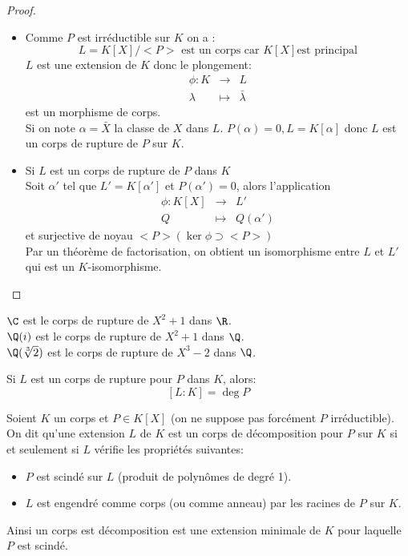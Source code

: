 \begin{proof}

	\begin{itemize}
		\item Comme $P$ est irréductible sur $K$ on a :
		      $$ L = K[X]/<P> \text{ est un corps car } K[X] \text{est principal}$$
		      $L$ est une extension de $K$ donc le plongement:
		      \begin{eqnarray*}
			      \phi: K &\to& L\\
			      \lambda   &\mapsto &\bar{\lambda}
		      \end{eqnarray*}
		      est un morphisme de corps.\\
		      Si on note $\alpha = \bar{X}$ la classe de $X$ dans $L$. $P(\alpha) = 0, L = K[\alpha]$
		      donc $L$ est un corps de rupture de $P$ sur $K$.
		\item Si $L$ est un corps de rupture de $P$ dans $K$ \\
		      Soit $\alpha'$ tel que $L' = K[\alpha']$ et $P(\alpha') = 0$, alors l'application
		      \begin{eqnarray*}
			      \phi : K[X] &\to& L'\\
			      Q &   \mapsto & Q(\alpha')
		      \end{eqnarray*}
		      et surjective de noyau $<P> (\ker \phi \supset <P>)$\\
		      Par un théorème de factorisation, on obtient un isomorphisme entre $L$ et $L'$ qui est un $K$-isomorphisme.
	\end{itemize}
\end{proof}

\begin{example}
	$\C$ est le corps de rupture de $X^2+1$ dans $\R$.\\
	$\Q(i)$ est le corps de rupture de $X^2+1$ dans $\Q$.\\
	$\Q(\sqrt[3]{2})$ est le corps de rupture de $X^3-2$ dans $\Q$.\\
\end{example}

\begin{remarque}[Important]
	Si $L$ est un corps de rupture pour $P$ dans $K$, alors:
	$$ [L : K] = \deg P$$
\end{remarque}


\begin{definition}
	Soient $K$ un corps et $P\in K[X]$ (on ne suppose pas forcément $P$ irréductible).\\
	On dit qu'une extension $L$ de $K$ est un corps de décomposition pour $P$ sur $K$ si et seulement si $L$ vérifie les propriétés suivantes:
	\begin{itemize}
		\item $P$ est scindé sur $L$ (produit de polynômes de degré 1).
		\item $L$ est engendré comme corps (ou comme anneau) par les racines de $P$ sur $K$.
	\end{itemize}

	Ainsi un corps est décomposition est une extension minimale de $K$ pour laquelle $P$ est scindé.
\end{definition}

